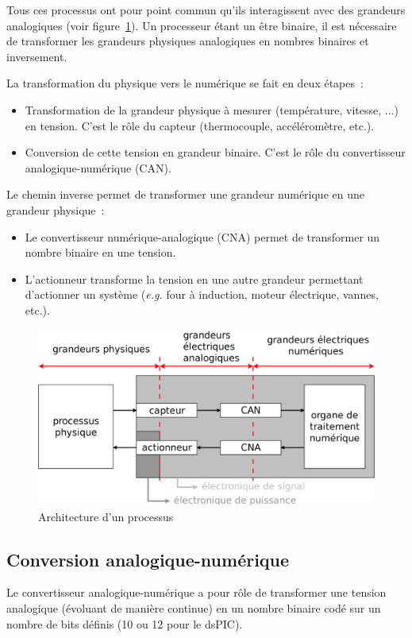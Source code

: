 \documentclass[11pt,a4paper]{article}
\theoremstyle{definition}%
\begin{document}
Tous ces processus ont pour point commun qu’ils interagissent avec des grandeurs analogiques (voir figure~\ref{fig:arch-processus}).
Un processeur étant un être binaire, il est nécessaire de transformer les grandeurs physiques analogiques en nombres binaires et inversement.

La transformation du physique vers le numérique se fait en deux étapes~:
\begin{itemize}
	\item Transformation de la grandeur physique à mesurer (température, vitesse, ...) en tension. C’est le rôle du capteur (thermocouple, accéléromètre, etc.).
	\item Conversion de cette tension en grandeur binaire. C’est le rôle du convertisseur analogique-numérique (CAN).
\end{itemize}

Le chemin inverse permet de transformer une grandeur numérique en une grandeur physique~:
\begin{itemize}
	\item Le convertisseur numérique-analogique (CNA) permet de transformer un nombre binaire en une tension.
	\item L’actionneur transforme la tension en une autre grandeur permettant d’actionner un système (\textit{e.g.} four à induction, moteur électrique, vannes, etc.).
\end{itemize}

\begin{figure}[H]
	\includegraphics[width=\textwidth]{arch-processus}
	\caption{Architecture d'un processus}
	\label{fig:arch-processus}
\end{figure}

\subsection{Conversion analogique-numérique}
Le convertisseur analogique-numérique a pour rôle de transformer une tension analogique (évoluant de manière continue) en un nombre binaire codé sur un nombre de bits définis (10 ou 12 pour le dsPIC).
\end{document}
